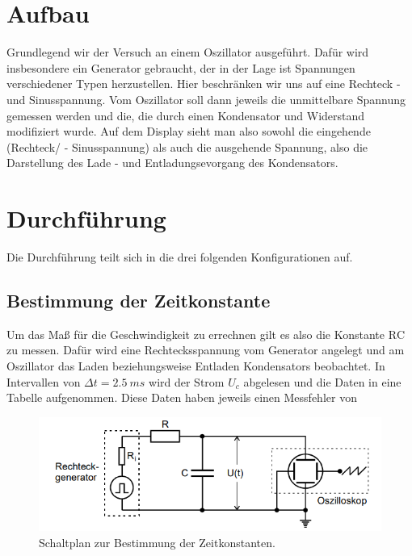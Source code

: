 \section{Aufbau}
\begin{minipage}[t] {0.5\textwidth}
    Grundlegend wir der Versuch an einem Oszillator ausgeführt.
    Dafür wird insbesondere ein Generator gebraucht, der in der Lage ist Spannungen verschiedener 
    Typen herzustellen. Hier beschränken wir uns auf eine Rechteck - und Sinusspannung. 
    Vom Oszillator soll dann jeweils die unmittelbare Spannung gemessen werden und die, 
    die durch einen Kondensator und Widerstand modifiziert wurde.
    Auf dem Display sieht man also sowohl die eingehende (Rechteck/ - Sinusspannung) als 
    auch die ausgehende Spannung, also die Darstellung des Lade - und Entladungsevorgang des Kondensators.
\end{minipage}
\begin{minipage} {0.5\textwidth}
\end{minipage}
\section{Durchführung}
Die Durchführung teilt sich in die  drei folgenden Konfigurationen auf.
\subsection{Bestimmung der Zeitkonstante}
Um das Maß für die Geschwindigkeit zu errechnen gilt es also die Konstante $\text{RC}$ zu messen.
Dafür wird eine Rechtecksspannung vom Generator angelegt und am Oszillator das Laden beziehungsweise Entladen
Kondensators beobachtet. In Intervallen von $\Delta t = \SI{2.5}{ms}$ wird der Strom $U_c$ abgelesen und die
Daten in eine Tabelle aufgenommen. Diese Daten haben jeweils einen Messfehler von 
\begin{figure}
    \centering
    \includegraphics[width=\textwidth]{bilder/RC.png}
    \caption{Schaltplan zur Bestimmung der Zeitkonstanten.\cite{skript}}
    \label{fig:RC}
\end{figure}

